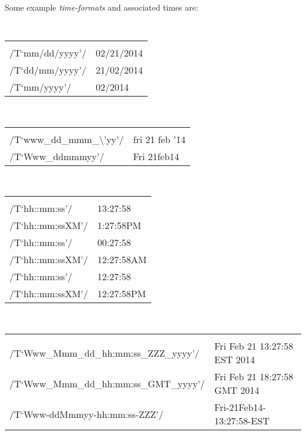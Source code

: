 \documentclass[12pt]{article}
\newcommand{\BSLASH}{\textbackslash}
\begin{document}
Some example {\em time-formats} and associated times are:
\begin{center}
\tt
\begin{tabular}{@{}l@{}l@{}}
\hspace*{3.4in} & \hspace*{3in} \\[-3ex]
/T`mm/dd/yyyy'/ & 02/21/2014 \\
/T`dd/mm/yyyy'/ & 21/02/2014 \\
/T`mm/yyyy'/ & 02/2014 \\
\end{tabular} \\
\begin{tabular}{@{}l@{}l@{}}
\hspace*{3.4in} & \hspace*{3in} \\[-3ex]
/T`www\_dd\_mmm\_\BSLASH'yy'/ & fri 21 feb '14 \\
/T`Www\_ddmmmyy'/ & Fri 21feb14 \\
\end{tabular} \\
\begin{tabular}{@{}l@{}l@{}}
\hspace*{3.4in} & \hspace*{3in} \\[-3ex]
/T`hh::mm:ss'/ & 13:27:58 \\
/T`hh::mm:ssXM'/ & 1:27:58PM \\
/T`hh::mm:ss'/ & 00:27:58 \\
/T`hh::mm:ssXM'/ & 12:27:58AM \\
/T`hh::mm:ss'/ & 12:27:58 \\
/T`hh::mm:ssXM'/ & 12:27:58PM \\
\end{tabular} \\
\begin{tabular}{@{}l@{}l@{}}
\hspace*{3.4in} & \hspace*{3in} \\[-3ex]
/T`Www\_Mmm\_dd\_hh:mm:ss\_ZZZ\_yyyy'/ & Fri Feb 21 13:27:58 EST 2014 \\
/T`Www\_Mmm\_dd\_hh:mm:ss\_GMT\_yyyy'/ & Fri Feb 21 18:27:58 GMT 2014 \\
/T`Www-ddMmmyy-hh:mm:ss-ZZZ'/	  & Fri-21Feb14-13:27:58-EST \\
\end{tabular}
\end{center}
\end{document}
